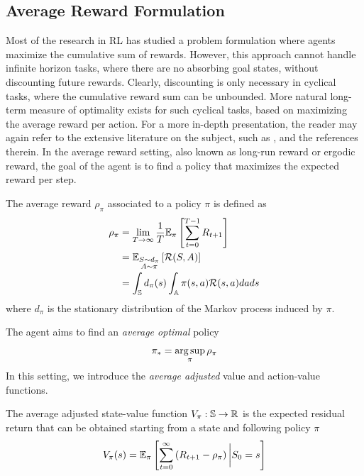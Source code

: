 \subsection{Average Reward Formulation}
Most of the research in RL has studied a problem formulation where agents
maximize the cumulative sum of rewards. However, this approach cannot handle
infinite horizon tasks, where there are no absorbing goal states, without
discounting future rewards. Clearly, discounting is only necessary in cyclical
tasks, where the cumulative reward sum can be unbounded. More natural long-term
measure of  optimality exists for such cyclical tasks, based on maximizing the
average reward per action. For a more in-depth presentation, the reader may again refer to the extensive literature on the subject, such as \cite{arapostathis1993discrete}, \cite{mahadevan1996average} and the references therein. In the average reward setting, also known as long-run reward or ergodic reward, the goal of the agent is to find a policy that maximizes the expected reward per step. 
\begin{definition}
	The average reward $\rho_\pi$ associated to a policy $\pi$ is defined as  
	\begin{equation}
		\begin{split}
			\rho_\pi &= \lim_{T\to\infty} \frac{1}{T} \E[\pi]{ \sum^{T-1}_{t=0} R_{t+1}}\\
					 &= \E[\substack{S\sim d_\pi \\ A \sim \pi}]{\calR(S,A)}\\ 
					 &= \int_\S d_\pi(s) \int_\A \pi(s, a) \calR(s,a) da ds\\ 
		\end{split}
	\end{equation}
where $d_\pi$ is the stationary distribution of the Markov process induced by $\pi$.
\end{definition}
The agent aims to find an \emph{average optimal} policy
\begin{equation}
	\pi_* = \argsup_\pi \rho_\pi
\end{equation}
In this setting, we introduce the \emph{average adjusted} value and action-value 
functions. 
\begin{definition}
	The average adjusted state-value function $V_\pi : \S \to \R$ is the
	expected residual return that can be obtained starting from a state and
	following policy $\pi$
	\begin{equation}
		V_\pi(s) = \E[\pi]{\sum^{\infty}_{t=0} \left(R_{t+1} - \rho_\pi\right)
		\bigg| S_0 = s}
	\end{equation}
\end{definition}
